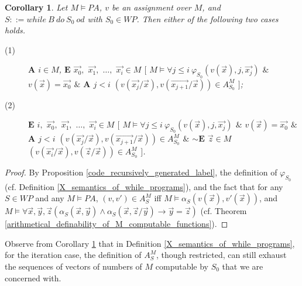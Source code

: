 \documentclass[a4paper,11pt]{article}
\begin{document}
\newtheorem{computational_power_for_the_nonstandard_semantics}[X_semantics_of_while_programs]{Corollary}
\begin{computational_power_for_the_nonstandard_semantics}\label{computational_power_for_the_nonstandard_semantics}
Let $M\models PA$, $v$ be an assignment over $M$, and $S ::= while\ B\ do\ S_0\ od$ with $S_0\in WP$. Then either of the following two cases holds.
\begin{description}
  \item[(1)] $\textbf{A}$ $i\in M$, $\textbf{E}$ $\vec{x_0},$ $\vec{x_1},$ $\ldots,$ $\vec{x_i}\in M$ $[$ $M\models \forall j\leq i ~ \varphi_{S_0}(v(\vec{x}),j,\vec{x_j})$ $\&$ $v(\vec{x}) = \vec{x_0}$ $\&$ $\textbf{A}$ $j< i$ $(v(\vec{x_j}/\vec{x}), v(\vec{x_{j+1}}/\vec{x}) ) \in A_{S_0}^M$ $]$;
  \item[(2)] $\textbf{E}$ $i,$ $\vec{x_0},$ $\vec{x_1},$ $\ldots,$ $\vec{x_i}\in M$ $[$ $M\models \forall j\leq i ~ \varphi_{S_0}(v(\vec{x}),j,\vec{x_j})$ $\&$ $v(\vec{x}) = \vec{x_0}$ $\&$ $\textbf{A}$ $j< i$ $(v(\vec{x_j}/\vec{x}), v(\vec{x_{j+1}}/\vec{x}) )\in A_{S_0}^M$ $\&$ $\sim \textbf{E}$ $\vec{z}\in M$ $( v(\vec{x_i}/\vec{x}), v(\vec{z}/\vec{x}) ) \in A_{S_0}^M$ $]$.
\end{description}
\end{computational_power_for_the_nonstandard_semantics}
\begin{proof}
By Proposition \ref{code_recursively_generated_label}, the definition of $\varphi_{S_0}$ (cf. Definition \ref{X_semantics_of_while_programs}), and the fact that for any $S\in WP$ and any $M\models PA$, $(v,v')\in A_S^M$ iff $M \models \alpha_S(v(\vec{x}),v'(\vec{x}))$, and $M \models \forall \vec{x},\vec{y},\vec{z}(\alpha_S(\vec{x},\vec{y})\wedge\alpha_S(\vec{x},\vec{z}/\vec{y})\rightarrow \vec{y}=\vec{z})$ (cf. Theorem \ref{arithmetical_definability_of_M_computable_functions}).
\end{proof}

Observe from Corollary \ref{computational_power_for_the_nonstandard_semantics} that in Definition \ref{X_semantics_of_while_programs}, for the iteration case, the definition of $A_S^M$, though restricted, can still exhaust the sequences of vectors of numbers of $M$ computable by $S_0$ that we are concerned with.
\end{document}
